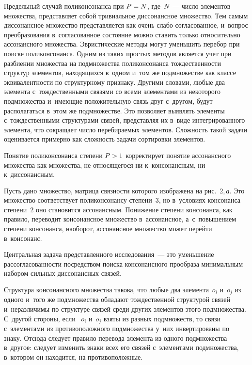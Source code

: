 \begin{multicols}{2}
     Предельный случай поликонсонанса при $P\hm= N$, где~$N$~--- чис\-ло 
элементов множества, пред\-став\-ля\-ет собой тривиальное диссонансное 
множество. Тем самым диссонансное множество \mbox{пред\-став\-ля\-ет\-ся} как очень 
слабо со\-гла\-со\-ван\-ное, и~вопрос преобразования в~со\-гла\-со\-ван\-ное со\-сто\-яние 
мож\-но ставить только относительно ассонансного множества. Эвристические 
методы могут уменьшить перебор при поиске поликонсонанса. Одним из 
таких прос\-тых методов является учет при раз\-би\-ении множества на 
подмножества поликонсонанса тож\-дест\-вен\-ности структур элементов, 
находящихся в~одном и~том же подмножестве как классе эк\-ви\-ва\-лент\-ности по 
структурному признаку. Другими словами, любые два элемента 
с~тож\-дест\-вен\-ны\-ми связями со всеми элементами из некоторого 
подмножества и~име\-ющие положительную связь друг с~другом, будут 
располагаться в~этом же подмножестве. Это поз\-во\-ля\-ет выявлять элементы 
с~тож\-дест\-вен\-ны\-ми структурами связей, пред\-став\-ляя их в~виде 
интегрированного элемента, что со\-кра\-ща\-ет чис\-ло пе\-ре\-би\-ра\-емых элементов. 
Слож\-ность такой задачи оценивается примерно как слож\-ность задачи 
сортировки элементов. 
     
     Понятие поликонсонанса степени $P\hm>1$ корректирует понятие 
ассонансного множества как множества, не относящегося ни 
к~консонансным, ни к~диссонансным. 
     
     Пусть дано множество, мат\-ри\-ца связ\-ности которого изображена на 
рис.~2,\,\textit{а}. 
          Это множество соответствует поликонсонансу степени~3, но 
в~условиях консонанса степени~2 оно становится ассонансным. Понижение 
степени консонанса, как правило, переводит консонансное множество 
в~ассонансное, а~с~повышением степени консонанса, наоборот, ассонансное 
множество может перейти в~консонанс. 
     
     Центральная задача пред\-став\-лен\-но\-го исследования~--- это уменьшение 
рас\-со\-гла\-со\-ван\-ности по\-средст\-вом поиска консонансного прообраза 
минимальным набором силь\-ных диссонансных связей. 
     
     Структура консонансного множества такова, что любые два 
элемента~$o_i$ и~$o_j$ из одного и~того же подмножества обладают 
тож\-дест\-вен\-ной структурой связей и~неразличимы по структуре связей среди 
других элементов этого подмножества. С~другой стороны, если ~$o_i$ 
и~$o_j$ взяты из разных подмножеств, то связи с~элементами из 
противоположного подмножества у~них инвертированы по знаку. Отсюда 
следует правило перевода элемента из одного подмножества в~другое: 
следует изменить знаки всех его связей с~элементами подмножества, 
в~котором он находится, на противоположные. 
     

\end{multicols}
